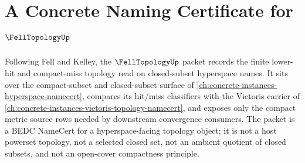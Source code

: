 \chapter{A Concrete Naming Certificate for $\FellTopologyUp$}
\label{ch:concrete-instances-fell-topology-namecert}

Following Fell and Kelley, the $\FellTopologyUp$ packet records the finite lower-hit and compact-miss topology read on closed-subset hyperspace names. It sits over the compact-subset and closed-subset surface of \autoref{ch:concrete-instances-hyperspace-namecert}, compares its hit/miss classifiers with the Vietoris carrier of \autoref{ch:concrete-instances-vietoris-topology-namecert}, and exposes only the compact metric source rows needed by downstream convergence consumers. The packet is a BEDC NameCert for a hyperspace-facing topology object; it is not a host powerset topology, not a selected closed set, not an ambient quotient of closed subsets, and not an open-cover compactness principle.

